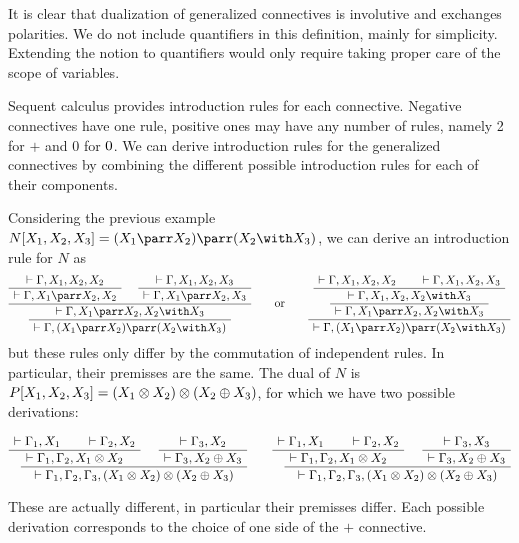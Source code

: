 It is clear that dualization of generalized connectives is involutive
and exchanges polarities. We do not include quantifiers in this
definition, mainly for simplicity. Extending the notion to quantifiers
would only require taking proper care of the scope of variables.

Sequent calculus provides introduction rules for each connective.
Negative connectives have one rule, positive ones may have any number of
rules, namely 2 for \(\plus\) and 0 for \(0\). We can derive
introduction rules for the generalized connectives by combining the
different possible introduction rules for each of their components.

Considering the previous example
\(N[X_1,X_2,X_3]=(X_1\parr X_2)\parr(X_2\with X_3)\), we can derive an
introduction rule for \(N\) as
\begin{equation*}
\AxRule{ \vdash \Gamma, X_1, X_2, X_2 }
  \UnaRule{ \vdash \Gamma, X_1\parr X_2, X_2 }
  \AxRule{ \vdash \Gamma, X_1, X_2, X_3 }
  \UnaRule{ \vdash \Gamma, X_1\parr X_2, X_3 }
  \BinRule{ \vdash \Gamma, X_1\parr X_2, X_2\with X_3 }
  \UnaRule{ \vdash \Gamma, (X_1\parr X_2)\parr(X_2\with X_3) }
  \DisplayProof
\quad\quad\text{or}\quad\quad
  \AxRule{ \vdash \Gamma, X_1, X_2, X_2 }
  \AxRule{ \vdash \Gamma, X_1, X_2, X_3 }
  \BinRule{ \vdash \Gamma, X_1, X_2, X_2\with X_3 }
  \UnaRule{ \vdash \Gamma, X_1\parr X_2, X_2\with X_3 }
  \UnaRule{ \vdash \Gamma, (X_1\parr X_2)\parr(X_2\with X_3) }
  \DisplayProof
\end{equation*}
but these rules only differ by the commutation of independent rules. In
particular, their premisses are the same. The dual of \(N\) is
\(P[X_1,X_2,X_3]=(X_1\otimes X_2)\otimes(X_2\oplus X_3)\), for which we have
two possible derivations:

\(\AxRule{ \vdash \Gamma_1, X_1 }
  \AxRule{ \vdash \Gamma_2, X_2 }
  \BinRule{ \vdash \Gamma_1, \Gamma_2, X_1\tens X_2 }
  \AxRule{ \vdash \Gamma_3, X_2 }
  \UnaRule{ \vdash \Gamma_3, X_2\plus X_3 }
  \BinRule{ \vdash \Gamma_1, \Gamma_2, \Gamma_3, (X_1\tens X_2)\tens(X_2\plus X_3) }
  \DisplayProof
\qquad
  \AxRule{ \vdash \Gamma_1, X_1 }
  \AxRule{ \vdash \Gamma_2, X_2 }
  \BinRule{ \vdash \Gamma_1, \Gamma_2, X_1\tens X_2 }
  \AxRule{ \vdash \Gamma_3, X_3 }
  \UnaRule{ \vdash \Gamma_3, X_2\plus X_3 }
  \BinRule{ \vdash \Gamma_1, \Gamma_2, \Gamma_3, (X_1\tens X_2)\tens(X_2\plus X_3) }
  \DisplayProof\)

These are actually different, in particular their premisses differ. Each
possible derivation corresponds to the choice of one side of the
\(\plus\) connective.


